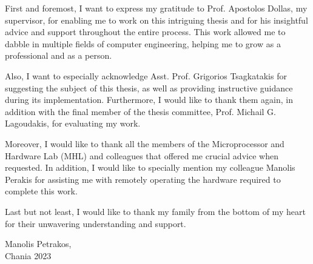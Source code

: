 \documentclass[
	12pt, %
	english,
	onehalfspacing, %
	liststotoc, %
	toctotoc, %
	parskip, %
	headsepline, %
]{MastersDoctoralThesis} %
\begin{document}

\begin{acknowledgements}
	\addchaptertocentry{\acknowledgementname} %
    First and foremost, I want to express my gratitude to Prof. Apostolos Dollas, my supervisor, for enabling me to work on this intriguing thesis and for his insightful advice and support throughout the entire process. This work allowed me to dabble in multiple fields of computer engineering, helping me to grow as a professional and as a person.

    Also, I want to especially acknowledge Asst. Prof. Grigorios Tsagkatakis for suggesting the subject of this thesis, as well as providing instructive guidance during its implementation. Furthermore, I would like to thank them again, in addition with the final member of the thesis committee, Prof. Michail G. Lagoudakis, for evaluating my work.

    Moreover, I would like to thank all the members of the Microprocessor and Hardware Lab (MHL) and colleagues that offered me crucial advice when requested. In addition, I would like to specially mention my colleague Manolis Perakis for assisting me with remotely operating the hardware required to complete this work.

    Last but not least, I would like to thank my family from the bottom of my heart for their unwavering understanding and support.
    \\
\begin{flushright}
Manolis Petrakos,\\
Chania 2023
\end{flushright}
\end{acknowledgements}


\tableofcontents %
\listoffigures %
\listoftables %
\listofalgorithms %

\end{document}
